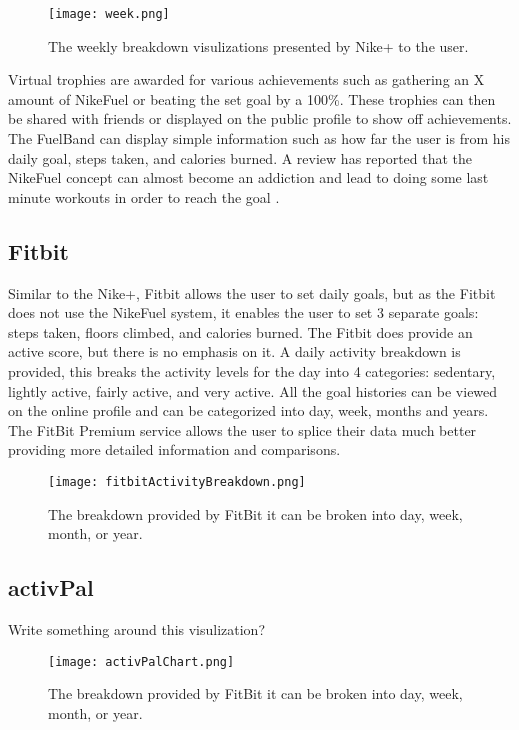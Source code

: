 \begin{figure}[h!]
	\centering
		\texttt{[image: week.png]}
		\caption{\footnotesize The weekly breakdown visulizations presented by Nike+ to the user. \cite{fuelbandTechSpce}}
		\label{fig:activityBreakdown}
\end{figure}

Virtual trophies are awarded for various achievements such as gathering an X amount of NikeFuel or beating the set goal by a 100\%. These trophies can then be shared with friends or displayed on the public profile to show off achievements. The FuelBand can display simple information such as how far the user is from his daily goal, steps taken, and calories burned. A review has reported that the NikeFuel concept can almost become an addiction and lead to doing some last minute workouts in order to reach the goal \cite{fuelbandDcRain}.

\subsection{Fitbit}
Similar to the Nike+, Fitbit allows the user to set daily goals, but as the Fitbit does not use the NikeFuel system, it enables the user to set 3 separate goals: steps taken, floors climbed, and calories burned. The Fitbit does provide an active score, but there is no emphasis on it. A daily activity breakdown is provided, this breaks the activity levels for the day into 4 categories: sedentary, lightly active, fairly active, and very active. All the goal histories can be viewed on the online profile and can be categorized into day, week, months and years. The FitBit Premium service allows the user to splice their data much better providing more detailed information and comparisons. 

\begin{figure}[h!]
	\centering
		\texttt{[image: fitbitActivityBreakdown.png]}
		\caption{\footnotesize The breakdown provided by FitBit it can be broken into day, week, month, or year.}
		\label{fig:fitbitActivityBreakdown}
\end{figure}

\subsection{activPal}
Write something around this visulization?

\begin{figure}[h!]
	\centering
		\texttt{[image: activPalChart.png]}
		\caption{\footnotesize The breakdown provided by FitBit it can be broken into day, week, month, or year.}
		\label{fig:fitbitActivityBreakdown}
\end{figure}


